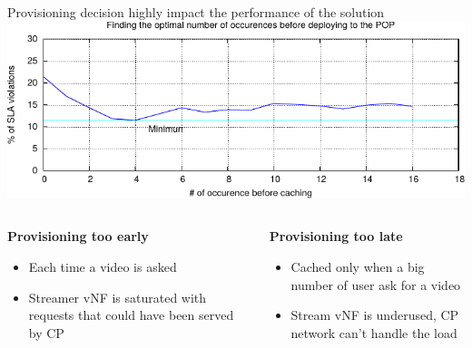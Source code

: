 \documentclass[a4paper]{beamer}
\begin{document}
\begin{frame}{Provisioning decision highly impact the performance of the solution}
	\includegraphics[width=0.90\linewidth]{cachingStrat_evaluation.pdf}
		\begin{columns}[T]
		\begin{column}[T]{0.5 \textwidth} 
		
		\textbf{Provisioning too early}
			\begin{itemize}
				\item Each time a video is asked
				\item Streamer vNF is saturated with requests that could have been served by CP
			\end{itemize}
		\end{column}
										
		\begin{column}[T]{0.5\textwidth} 
										  
			\textbf{Provisioning too late}
			\begin{itemize}
				\item Cached only when a big number of user ask for a video
				\item Stream vNF is underused, CP network can't handle the load
			\end{itemize}
			
		\end{column}
																										
	\end{columns}
\end{frame}
\end{document}
